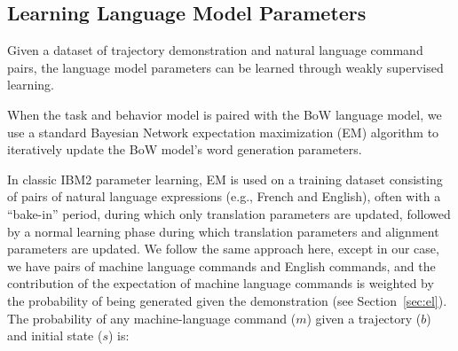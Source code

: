 \documentclass[conference]{IEEEtran}
\begin{document}
\subsection{Learning Language Model Parameters}
\label{sec:learnLang}
Given a dataset of trajectory demonstration and natural language command pairs, the language model parameters can be learned through weakly supervised learning. 

When the task and behavior model is paired with the BoW language model, we use a standard Bayesian Network expectation maximization (EM) algorithm \cite{dempster77} to iteratively update the BoW model's word generation parameters. 

In classic IBM2 parameter learning, EM is used on a training dataset consisting of pairs of natural language expressions (e.g., French and English), often with a ``bake-in'' period, during which only translation parameters are updated, followed by a normal learning phase during which translation parameters and alignment parameters are updated. We follow the same approach here, except in our case, we have pairs of machine language commands and English commands, and the contribution of the expectation of machine language commands is weighted by the probability of being generated given the demonstration (see Section~\ref{sec:el}). The probability of any machine-language command ($m$) given a trajectory ($b$) and initial state ($s$) is:
\end{document}
